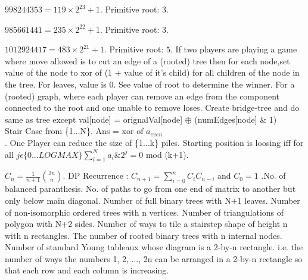 $998244353 = 119 \times 2^{23} + 1$. Primitive root: $3$.

$985661441 = 235 \times 2^{22} + 1$. Primitive root: $3$.

$1012924417 = 483 \times 2^{21} + 1$. Primitive root: $5$.
 If two players are playing a game where move allowed is to cut an edge of a (rooted) tree then for each node,set value of the node to xor of (1 + value of it's child) for all children of the node in the tree. For leaves, value is 0. See value of root to determine the winner. For a (rooted) graph, where each player can remove an edge from the component connected to the root and one unable to remove loses. Create bridge-tree and do same as tree except val[node] = orignalVal[node] $\oplus$ (numEdges[node] \& 1) \\
 Stair Case from \{1...N\}. Ans = xor of $a_{even}$ \\
. One Player can reduce the size of \{1...k\} piles. Starting position is loosing iff for all $j \epsilon \{0...LOGMAX\} \sum_{i=1}^{N} a_{i}\&2^{j} = 0$ mod (k+1).
\vspace{-3mm}
\\

 
 
 
\vspace{-7mm}
\vspace{-3mm}

$C_{n} = \frac{1}{n+1}{{2n}\choose{n}}$. DP Recurrence : $C_{n+1} = \sum_{i=0}^{n}C_{i}C_{n-i}$ and $C_{0}=1$ .No. of balanced paranthesis. No. of paths to go from one end of matrix to another but only below main diagonal. Number of full binary trees with N+1 leaves. Number of non-isomorphic ordered trees with n vertices. Number of triangulations of polygon with N+2 sides. Number of ways to tile a stairstep shape of height n with n rectangles. The number of rooted binary trees with n internal nodes.  Number of standard Young tableaux whose diagram is a 2-by-n rectangle. i.e. the number of ways the numbers 1, 2, ..., 2n can be arranged in a 2-by-n rectangle so that each row and each column is increasing.
 
